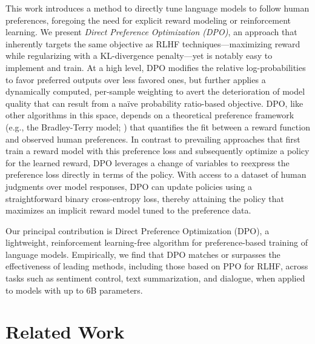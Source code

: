 This work introduces a method to directly tune language models to follow human preferences, foregoing the need for explicit reward modeling or reinforcement learning. We present \textit{{Direct Preference Optimization} (DPO)}, an approach that inherently targets the same objective as RLHF techniques—maximizing reward while regularizing with a KL-divergence penalty—yet is notably easy to implement and train. At a high level, DPO modifies the relative log-probabilities to favor preferred outputs over less favored ones, but further applies a dynamically computed, per-sample weighting to avert the deterioration of model quality that can result from a naïve probability ratio-based objective. DPO, like other algorithms in this space, depends on a theoretical preference framework (e.g., the Bradley-Terry model; \cite{bradley1952rankanalysis}) that quantifies the fit between a reward function and observed human preferences. In contrast to prevailing approaches that first train a reward model with this preference loss and subsequently optimize a policy for the learned reward, DPO leverages a change of variables to reexpress the preference loss directly in terms of the policy. With access to a dataset of human judgments over model responses, DPO can update policies using a straightforward binary cross-entropy loss, thereby attaining the policy that maximizes an implicit reward model tuned to the preference data.

Our principal contribution is Direct Preference Optimization (DPO), a lightweight, reinforcement learning-free algorithm for preference-based training of language models. Empirically, we find that DPO matches or surpasses the effectiveness of leading methods, including those based on PPO for RLHF, across tasks such as sentiment control, text summarization, and dialogue, when applied to models with up to 6B parameters.

\section{Related Work}

